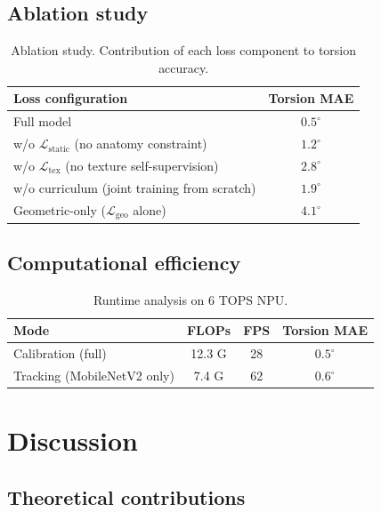 \documentclass[review]{elsarticle}
\begin{document}
\subsection{Ablation study}

\begin{table}[t]
\caption{Ablation study. Contribution of each loss component to torsion accuracy.}
\label{tab:ablation}
\centering
\begin{tabular}{lc}
\toprule
Loss configuration & Torsion MAE \\
\midrule
Full model & $0.5^\circ$ \\
w/o $\mathcal{L}_{\text{static}}$ (no anatomy constraint) & $1.2^\circ$ \\
w/o $\mathcal{L}_{\text{tex}}$ (no texture self-supervision) & $2.8^\circ$ \\
w/o curriculum (joint training from scratch) & $1.9^\circ$ \\
Geometric-only ($\mathcal{L}_{\text{geo}}$ alone) & $4.1^\circ$ \\
\bottomrule
\end{tabular}
\end{table}

\subsection{Computational efficiency}

\begin{table}[t]
\caption{Runtime analysis on 6 TOPS NPU.}
\label{tab:runtime}
\centering
\begin{tabular}{lccc}
\toprule
Mode & FLOPs & FPS & Torsion MAE \\
\midrule
Calibration (full) & 12.3 G & 28 & $0.5^\circ$ \\
Tracking (MobileNetV2 only) & 7.4 G & 62 & $0.6^\circ$ \\
\bottomrule
\end{tabular}
\end{table}

\section{Discussion}

\subsection{Theoretical contributions}
\end{document}
